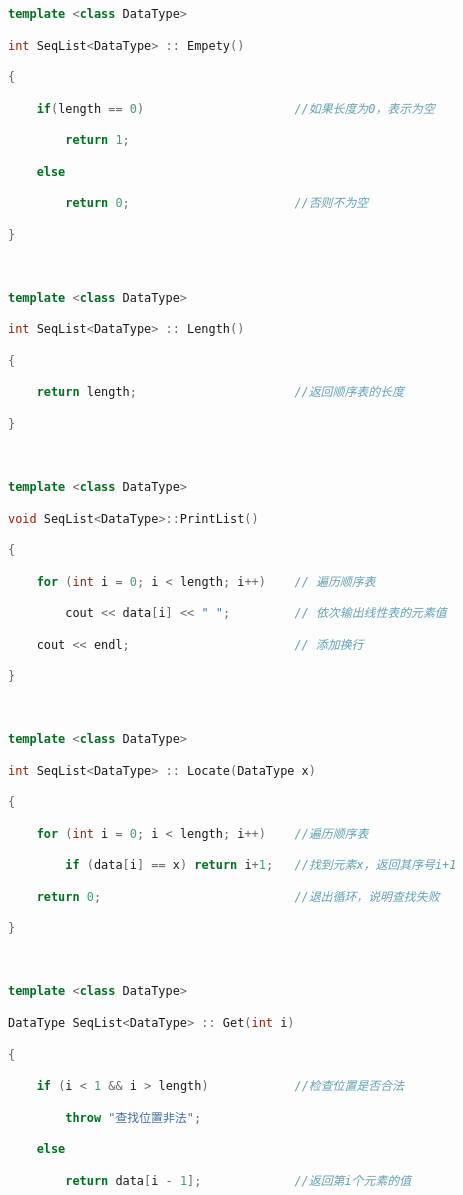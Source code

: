 \begin{lstlisting}[language=C++]
template <class DataType>

int SeqList<DataType> :: Empety()

{

    if(length == 0)                     //如果长度为0，表示为空

        return 1;

    else

        return 0;                       //否则不为空

}

  

template <class DataType>

int SeqList<DataType> :: Length()

{

    return length;                      //返回顺序表的长度

}

  

template <class DataType>  

void SeqList<DataType>::PrintList()

{

    for (int i = 0; i < length; i++)    // 遍历顺序表

        cout << data[i] << " ";         // 依次输出线性表的元素值

    cout << endl;                       // 添加换行

}

  

template <class DataType>  

int SeqList<DataType> :: Locate(DataType x)

{

    for (int i = 0; i < length; i++)    //遍历顺序表

        if (data[i] == x) return i+1;   //找到元素x，返回其序号i+1

    return 0;                           //退出循环，说明查找失败

}

  

template <class DataType>  

DataType SeqList<DataType> :: Get(int i)

{

    if (i < 1 && i > length)            //检查位置是否合法

        throw "查找位置非法";

    else

        return data[i - 1];             //返回第i个元素的值


\end{lstlisting}
